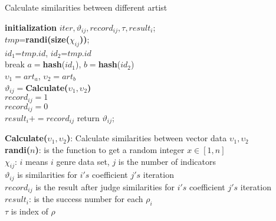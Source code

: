 \documentclass{article}
\begin{document}
\begin{algorithm}
    \caption{Calculate similarities between different artist} %
    \textbf{initialization} $iter, \vartheta_{ij}, record_{ij}, \tau,result_{i}$; \\
    {
        {        
            {
                $tmp$=\textbf{randi(size($\chi_{ij}$))};\\
                $id_{1}$=$tmp.id$,
                $id_{2}$=$tmp.id$\\
                {
                        break
                }
            }
            $a=$\textbf{hash}($id_{1}$), $b=$\textbf{hash}($id_{2}$)\\
            $\upsilon_{1}=art_{a}$, $\upsilon_{2}=art_{b}$\\
            $\vartheta_{ij}=$\textbf{Calculate($\upsilon_{1},\upsilon_{2}$)}\\
            {
                $record_{ij}=1$ \\
            }
            {
                $record_{ij}=0$ \\
            }
        }
    }
    {
        {
            $result_{i}+=record_{ij}$
        }        
    }
    return $\vartheta_{ij}$; \\
\end{algorithm}

\textbf{Calculate($\upsilon_{1},\upsilon_{2}$)}: Calculate similarities between vector data $\upsilon_{1},\upsilon_{2}$\\
\textbf{randi($n$)}: is the function to get a random integer $x \in [1,n]$\\
$\chi_{ij}$: $i$ means $i$ genre data set, $j$ is the number of indicators\\
$\vartheta_{ij}$ is similarities for $i's$ coefficient $j's$ iteration\\
$record_{ij}$ is the result after judge similarities for $i's$ coefficient $j's$ iteration\\
$result_{i}$: is the success number for each $\rho_{i}$\\
$\tau$ is index of $\rho$
\end{document}
